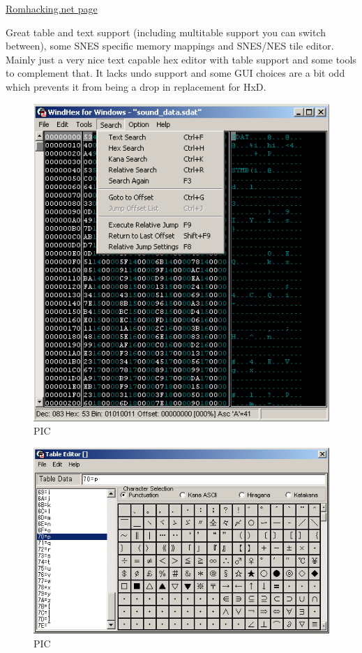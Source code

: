\documentclass[
]{book}
\begin{document}
\href{http://www.romhacking.net/utilities/291/}{Romhacking.net page}

Great table and text support (including multitable support you can switch between), some SNES specific memory mappings and SNES/NES tile editor. Mainly just a very nice text capable hex editor with table support and some tools to complement that. It lacks undo support and some GUI choices are a bit odd which prevents it from being a drop in replacement for HxD.

\begin{figure}
\centering
\includegraphics{images/8_home_fast6191_romhackingguide_unrenamed_files___omhackingguidehexeditorsshowcasewindhex32_1.png}
\caption{PIC}
\end{figure}

\begin{figure}
\centering
\includegraphics{images/9_home_fast6191_romhackingguide_unrenamed_files___omhackingguidehexeditorsshowcasewindhex32_2.png}
\caption{PIC}
\end{figure}
\end{document}
